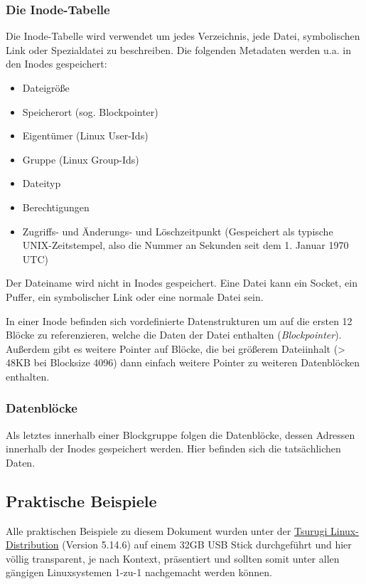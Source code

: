 \subsubsection{Die Inode-Tabelle}

Die Inode-Tabelle wird verwendet um jedes Verzeichnis, jede Datei, symbolischen Link oder Spezialdatei zu beschreiben. Die folgenden Metadaten werden u.a. in den Inodes gespeichert:

\begin{itemize}
	\item Dateigröße
	\item Speicherort (sog. Blockpointer)
	\item Eigentümer (Linux User-Ids)
	\item Gruppe (Linux Group-Ids)
	\item Dateityp
	\item Berechtigungen
	\item Zugriffs- und Änderungs- und Löschzeitpunkt (Gespeichert als typische UNIX-Zeitstempel, also die Nummer an Sekunden seit dem 1. Januar 1970 UTC)
\end{itemize}

Der Dateiname wird nicht in Inodes gespeichert. Eine Datei kann ein Socket, ein Puffer, ein symbolischer Link oder eine normale Datei sein.

In einer Inode befinden sich vordefinierte Datenstrukturen um auf die ersten 12 Blöcke zu referenzieren, welche die Daten der Datei enthalten (\textit{Blockpointer}). Außerdem gibt es weitere Pointer auf Blöcke, die bei größerem Dateiinhalt (> 48KB bei Blocksize 4096) dann einfach weitere Pointer zu weiteren Datenblöcken enthalten.

\subsubsection{Datenblöcke}

Als letztes innerhalb einer Blockgruppe folgen die Datenblöcke, dessen Adressen innerhalb der Inodes gespeichert werden. Hier befinden sich die tatsächlichen Daten.


\subsection{Praktische Beispiele}

Alle praktischen Beispiele zu diesem Dokument wurden unter der \href{https://tsurugi-linux.org/}{Tsurugi Linux-Distribution}  (Version 5.14.6) auf einem 32GB USB Stick durchgeführt und hier völlig transparent, je nach Kontext, präsentiert und sollten somit unter allen gängigen Linuxsystemen 1-zu-1 nachgemacht werden können. 

